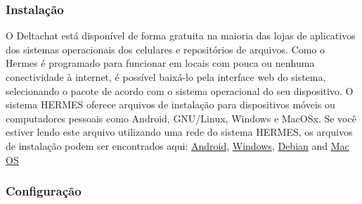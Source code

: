 \documentclass[11pt,a4paper]{article}
\begin{document}

\subsubsection{Instalação}

O Deltachat está disponível de forma gratuita na maioria das lojas de aplicativos dos sistemas operacionais dos celulares e repositórios de arquivos. Como o Hermes é programado para funcionar em locais com pouca ou nenhuma conectividade à internet, é possível baixá-lo pela interface web do sistema, selecionando o pacote de acordo com o sistema operacional do seu dispositivo. O sistema HERMES oferece arquivos de instalação para dispositivos móveis ou computadores pessoais como Android, GNU/Linux, Windows e MacOSx. Se você estiver lendo este arquivo utilizando uma rede do sistema HERMES, os arquivos de instalação podem ser encontrados aqui: \href{ http://10.0.0.1/dowloads/deltachat.apk}{Android},  \href{ http://10.0.0.1/dowloads/deltachat.exe}{Windows},  \href{ http://10.0.0.1/dowloads/deltachat.deb}{Debian} and \href{http://10.0.0.1/dowloads/deltachat.dmg}{Mac OS}



\subsubsection{Configuração}
\end{document}
